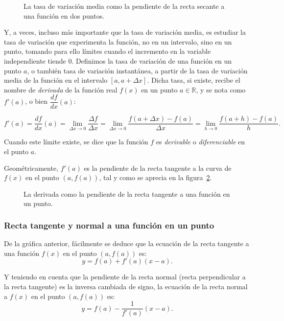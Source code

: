 \begin{figure}[h!]
\begin{center}
\scalebox{1}{}
\caption{La tasa de variación media como la pendiente de la recta
secante a una función en dos puntos.} \label{g:secante}
\end{center}
\end{figure}


Y, a veces, incluso más importante que la tasa de variación media,
es estudiar la tasa de variación que experimenta la función, no en
un intervalo, sino en un punto, tomando para ello límites cuando el
incremento en la variable independiente tiende 0. Definimos la tasa
de variación de una función en un punto $a$, o también tasa de
variación instantánea, a partir de la tasa de variación media de la
función en el intervalo $[a,a+\Delta x]$. Dicha tasa, si existe,
recibe el nombre de \emph{derivada} de la función real $f(x)$ en un
punto $a\in \mathbb{R}$, y se nota como $f'(a)$, o bien
$\dfrac{df}{dx}(a)$:

\[
f'(a)=\dfrac{df}{dx}(a)= \lim_{\Delta x\rightarrow 0}\frac{\Delta
f}{\Delta x}=\lim_{\Delta x\rightarrow 0}\frac{f(a+\Delta
x)-f(a)}{\Delta x}=\lim_{h\rightarrow 0}\frac{f(a+h)-f(a)}{h}.
\]

Cuando este límite existe, se dice que la función $f$ es
\emph{derivable} o \emph{diferenciable} en el punto $a$.

Geométricamente, $f'(a)$ es la pendiente de la recta tangente a la
curva de $f(x)$ en el punto $(a,f(a))$, tal y como se aprecia en la
figura~\ref{g:tangente}.

\begin{figure}[h!]
\begin{center}
\scalebox{1}{}
\caption{La derivada como la pendiente de la recta tangente a una
función en un punto.} \label{g:tangente}
\end{center}
\end{figure}

\subsubsection*{Recta tangente y normal a una función en un punto}
De la gráfica anterior, fácilmente se deduce que la ecuación de la
recta tangente a una función $f(x)$ en el punto $(a,f(a))$ es:
\[
y=f(a)+f'(a)(x-a).
\]

Y teniendo en cuenta que la pendiente de la recta normal (recta
perpendicular a la recta tangente) es la inversa cambiada de signo,
la ecuación de la recta normal a $f(x)$ en el punto $(a,f(a))$ es:
\[
y=f(a)-\frac{1}{f'(a)}(x-a).
\]

